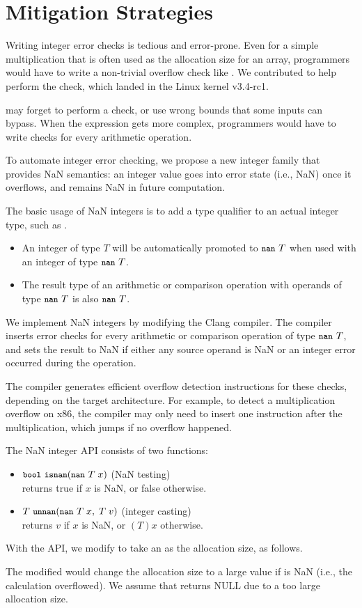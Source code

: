 \section{Mitigation Strategies}
\label{s:miti}

Writing integer error checks is tedious and error-prone.
Even for a simple multiplication  that is often used
as the allocation size for an array, programmers would
have to write a non-trivial overflow check like .  We contributed 
to help perform the check, which landed in the Linux kernel v3.4-rc1.

may forget to perform a check, or use wrong bounds that some inputs
can bypass. 
When the expression gets more complex,
programmers would have to write checks for every arithmetic operation.

To automate integer error checking, we propose a new
integer family that provides NaN semantics: an integer value goes
into error state (i.e., NaN) once it overflows, and remains NaN in
future computation.

The basic usage of NaN integers is to add a type qualifier 
to an actual integer type, such as .
\begin{itemize}
\item
An integer of type $T$ will be automatically promoted to $\cc{nan}\ T$
when used with an integer of type $\cc{nan}\ T$.
\item
The result type of an arithmetic or comparison operation with
operands of type $\cc{nan}\ T$ is also $\cc{nan}\ T$.
\end{itemize}
We implement NaN integers by modifying the Clang compiler.
The compiler inserts error checks for every arithmetic or
comparison operation of type $\cc{nan}\ T$, and sets the result to
NaN if either any source operand is NaN or an integer error occurred
during the operation.

The compiler generates efficient overflow detection instructions
for these checks, depending on the target architecture.  For example,
to detect a multiplication overflow on x86, the compiler may only
need to insert one  instruction after the multiplication,
which jumps if no overflow happened.

\noindent
The NaN integer API consists of two functions:
\begin{itemize}
\item
$\cc{bool}\ \cc{isnan}(\cc{nan}\ T\; x)$ \hfill (NaN testing) \\
returns true if $x$ is NaN, or false otherwise.
\item
$T\ \cc{unnan}(\cc{nan}\ T\; x,\; T\; v)$ \hfill (integer casting) \\
returns $v$ if $x$ is NaN, or $(T)x$ otherwise.
\end{itemize}
With the API, we modify  to take an  as
the allocation size, as follows.

The modified  would change the allocation size to a large
value  if  is NaN (i.e., the calculation
overflowed).  We assume that  returns
NULL due to a too large allocation size.

